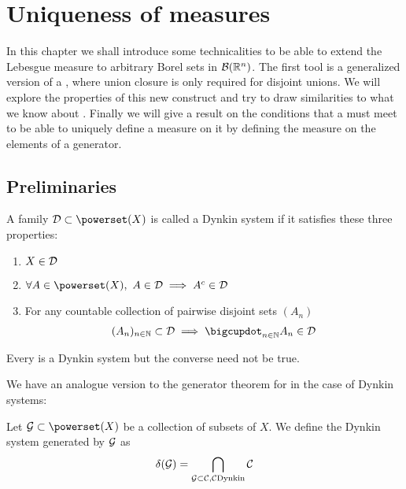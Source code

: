 
\chapter{Uniqueness of measures}

In this chapter we shall introduce some technicalities to be able to extend the Lebesgue measure to arbitrary Borel sets in $\mathcal{B}(\mathbb{R}^n)$. The first tool is a generalized version of a \siga, where union closure is only required for disjoint unions. We will explore the properties of this new construct and try to draw similarities to what we know about \sigas. Finally we will give a result on the conditions that a \siga must meet to be able to uniquely define a measure on it by defining the measure on the elements of a generator.

\section{Preliminaries}


\begin{dfn}
	A family $\calD \subset \powerset(X)$ is called a Dynkin system if it satisfies these three properties:
	\begin{enumerate}
		\item $X \in \mathcal{D}$
		\item $\forall A \in \powerset(X),\ A \in \calD \implies A^\complement \in \calD$
		\item For any countable collection of pairwise disjoint sets $(A_n)$
		\begin{align*}
			(A_n)_{n\in\N} \subset \calD \implies \bigcupdot_{n \in \N} A_n \in \calD
		\end{align*}
	\end{enumerate}
\end{dfn}

\begin{remark}
	Every \siga is a Dynkin system but the converse need not be true.
\end{remark}


We have an analogue version to the generator theorem for \sigas in the case of Dynkin systems:

\begin{dfn}
	Let $\calG \subset \powerset(X)$ be a collection of subsets of $X$. We define the Dynkin system generated by $\mathcal{G}$ as
	\begin{align*}
		\delta(\mathcal{G}) = \bigcap_{\mathcal{G} \subset \mathcal{C}, \mathcal{C} \text{Dynkin}} \mathcal{C}
	\end{align*}
\end{dfn}

